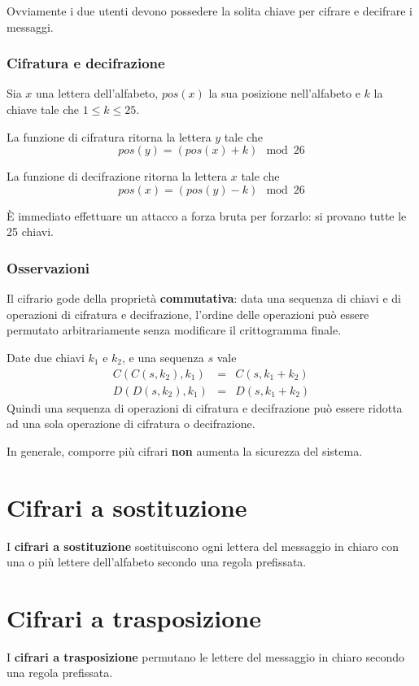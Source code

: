 Ovviamente i due utenti devono possedere la solita chiave per cifrare e decifrare i messaggi.

\subsubsection{Cifratura e decifrazione}
Sia $x$ una lettera dell'alfabeto, $pos(x)$ la sua posizione nell'alfabeto e $k$ la chiave tale che $1 \leq k \leq 25$.

La funzione di cifratura ritorna la lettera $y$ tale che
\[ pos(y) = (pos(x) + k) \mod{26} \]

La funzione di decifrazione ritorna la lettera $x$ tale che
\[ pos(x) = (pos(y) - k) \mod{26} \]

\`E immediato effettuare un attacco a forza bruta per forzarlo: si provano tutte le 25 chiavi.

\subsubsection{Osservazioni}
Il cifrario gode della propriet\`a \textbf{commutativa}: data una sequenza di chiavi e di operazioni di cifratura e
decifrazione, l'ordine delle operazioni pu\`o essere permutato arbitrariamente senza modificare il crittogramma finale.

Date due chiavi $k_1$ e $k_2$, e una sequenza $s$ vale
\[
	\begin{matrix}
		C(C(s, k_2), k_1) & = & C(s, k_1 + k_2) \\
		D(D(s, k_2), k_1) & = & D(s, k_1 + k_2)
	\end{matrix}
\]
Quindi una sequenza di operazioni di cifratura e decifrazione pu\`o essere ridotta ad una sola operazione di cifratura
o decifrazione.

In generale, comporre pi\`u cifrari \textbf{non} aumenta la sicurezza del sistema.

\section{Cifrari a sostituzione}
I \textbf{cifrari a sostituzione} sostituiscono ogni lettera del messaggio in chiaro con una o pi\`u lettere
dell'alfabeto secondo una regola prefissata.

\section{Cifrari a trasposizione}
I \textbf{cifrari a trasposizione} permutano le lettere del messaggio in chiaro secondo una regola prefissata.